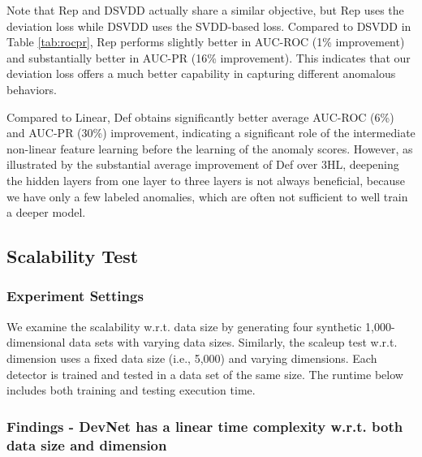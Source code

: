 \documentclass[sigconf]{acmart}
\begin{document}
Note that Rep and DSVDD actually share a similar objective, but Rep uses the deviation loss while DSVDD uses the SVDD-based loss. Compared to DSVDD in Table \ref{tab:rocpr}, Rep performs slightly better in AUC-ROC (1\% improvement) and substantially better in AUC-PR (16\% improvement). This indicates that our deviation loss offers a much better capability in capturing different anomalous behaviors.

Compared to Linear, Def obtains significantly better average AUC-ROC (6\%) and AUC-PR (30\%) improvement, indicating a significant role of the intermediate non-linear feature learning before the learning of the anomaly scores. However, as illustrated by the substantial average improvement of Def over 3HL, deepening the hidden layers from one layer to three layers is not always beneficial, because we have only a few labeled anomalies, which are often not sufficient to well train a deeper model.

\subsection{Scalability Test}

\subsubsection{Experiment Settings} 
We examine the scalability w.r.t. data size by generating four synthetic 1,000-dimensional data sets with varying data sizes. Similarly, the scaleup test w.r.t. dimension uses a fixed data size (i.e., 5,000) and varying dimensions. Each detector is trained and tested in a data set of the same size. The runtime below includes both training and testing execution time.

\subsubsection{Findings - DevNet has a linear time complexity w.r.t. both data size and dimension}
\end{document}
